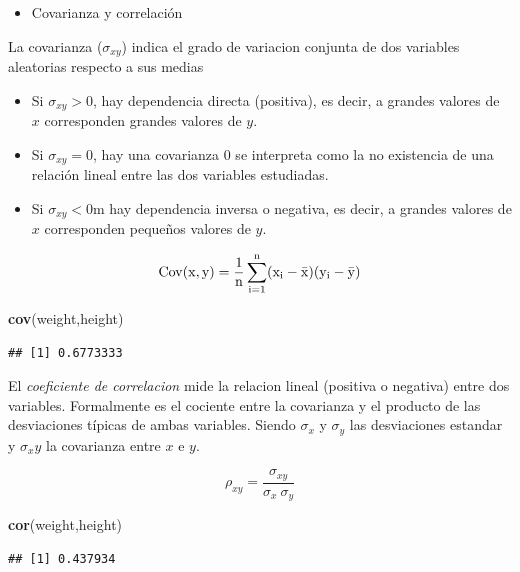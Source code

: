 \documentclass[]{article}
\def\tightlist{}
\newenvironment{Shaded}{\begin{snugshade}}{\end{snugshade}}
\newcommand{\KeywordTok}[1]{\textcolor[rgb]{0.13,0.29,0.53}{\textbf{{#1}}}}
\newcommand{\NormalTok}[1]{{#1}}
\numberwithin{equation}{section}
\begin{document}
\begin{itemize}
\tightlist
\item
  Covarianza y correlación
\end{itemize}

La covarianza (\(\sigma_{xy}\)) indica el grado de variacion conjunta de
dos variables aleatorias respecto a sus medias

\begin{itemize}
\tightlist
\item
  Si \(\sigma_{xy}> 0\), hay dependencia directa (positiva), es decir, a
  grandes valores de \(x\) corresponden grandes valores de \(y\).
\item
  Si \(\sigma_{xy}= 0\), hay una covarianza 0 se interpreta como la no
  existencia de una relación lineal entre las dos variables estudiadas.
\item
  Si \(\sigma_{xy}< 0\)m hay dependencia inversa o negativa, es decir, a
  grandes valores de \(x\) corresponden pequeños valores de \(y\).
\end{itemize}

\[
\rm{Cov}(x,y) = \frac{1}{n}\sum_{i=1}^{n}(x_i - \bar{x})(y_i - \bar{y})
\]

\begin{Shaded}
\begin{Highlighting}[]
\KeywordTok{cov}\NormalTok{(weight,height)}
\end{Highlighting}
\end{Shaded}

\begin{verbatim}
## [1] 0.6773333
\end{verbatim}

El \emph{coeficiente de correlacion} mide la relacion lineal (positiva o
negativa) entre dos variables. Formalmente es el cociente entre la
covarianza y el producto de las desviaciones típicas de ambas variables.
Siendo \(\sigma_x\) y \(\sigma_y\) las desviaciones estandar y
\(\sigma_xy\) la covarianza entre \(x\) e \(y\).

\[
      \rho_{xy}  = \frac{\sigma_{xy}}{\sigma_x~\sigma_y}
\]

\begin{Shaded}
\begin{Highlighting}[]
\KeywordTok{cor}\NormalTok{(weight,height)}
\end{Highlighting}
\end{Shaded}

\begin{verbatim}
## [1] 0.437934
\end{verbatim}
\end{document}
